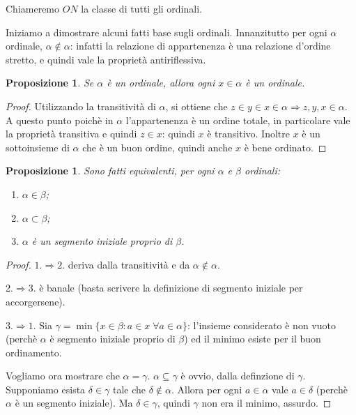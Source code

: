\documentclass[a4paper,10pt,oneside]{article}
\newcommand{\nin}{\not\in}
\theoremstyle{plain}
\newtheorem{myprop}[mytheorem]{Proposizione}
\theoremstyle{definition}
\theoremstyle{remark}
\begin{document}
Chiameremo $ON$ la classe di tutti gli ordinali.

Iniziamo a dimostrare alcuni fatti base sugli ordinali. Innanzitutto per ogni $\alpha$ ordinale, $\alpha \not\in \alpha$: infatti la relazione di appartenenza è una relazione d'ordine stretto, e quindi vale la proprietà antiriflessiva.

\begin{myprop}\label{prop:xinord}
Se $\alpha$ è un ordinale, allora ogni $x\in \alpha$ è un ordinale.
\end{myprop}
\begin{proof}
 Utilizzando la transitività di $\alpha$, si ottiene che $z\in y \in x \in \alpha\Rightarrow z,y,x\in \alpha$. A questo punto poichè in $\alpha$ l'appartenenza è un ordine totale, in particolare vale la proprietà transitiva e quindi $z\in x$: quindi $x$ è transitivo. Inoltre $x$ è un sottoinsieme di $\alpha$ che è un buon ordine, quindi anche $x$ è bene ordinato.
\end{proof}

\begin{myprop}
Sono fatti equivalenti, per ogni $\alpha$ e $ \beta$ ordinali:
\begin{enumerate}
 \item $\alpha \in \beta$;
 \item $\alpha \subset \beta$;
 \item $\alpha$ è un segmento iniziale proprio di $\beta$.
\end{enumerate}
\end{myprop}
\begin{proof}
 $1. \Rightarrow 2.$ deriva dalla transitività e da $\alpha \nin \alpha$. 
 
 $2. \Rightarrow 3.$ è banale (basta scrivere la definizione di segmento iniziale per accorgersene).
 
 $3. \Rightarrow 1.$ Sia $\gamma = \min\{x\in\beta: a\in x \; \forall a\in \alpha \}$: l'insieme considerato è non vuoto (perchè $\alpha$ è segmento iniziale proprio di $\beta$) ed il minimo esiste per il buon ordinamento. 
 
 Vogliamo ora mostrare che $\alpha = \gamma$. $\alpha \subseteq \gamma$ è ovvio, dalla definzione di $\gamma$. Supponiamo esista $\delta\in\gamma$ tale che $\delta \nin \alpha$. Allora per ogni $a \in \alpha$ vale $a \in \delta$ (perchè $\alpha$ è un segmento iniziale). Ma $\delta \in \gamma$, quindi $\gamma$ non era il minimo, assurdo.
\end{proof}
\end{document}
